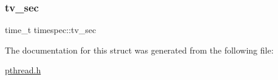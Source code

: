 \mbox{\label{structtimespec_afc3302668d7cb5952f590da69fdd4955}} 
\subsubsection{\texorpdfstring{tv\+\_\+sec}{tv\_sec}}
{\footnotesize\ttfamily time\+\_\+t timespec\+::tv\+\_\+sec}



The documentation for this struct was generated from the following file\+:\begin{DoxyCompactItemize}
\item 
\mbox{\hyperlink{pthread_8h}{pthread.\+h}}\end{DoxyCompactItemize}
